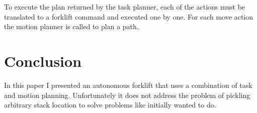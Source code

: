 \documentclass[letterpaper, 10 pt, conference]{ieeeconf}  %
\begin{document}
To execute the plan returned by the task planner, each of the actions must be translated to a forklift command and executed one by one. For each move action the motion planner is called to plan a path.


\section{Conclusion}

In this paper I presented an autonomous forklift that uses a combination of task and motion planning. Unfortunately it does not address the problem of pickling arbitrary stack location to solve problems like initially wanted to do. 




%

\end{document}
